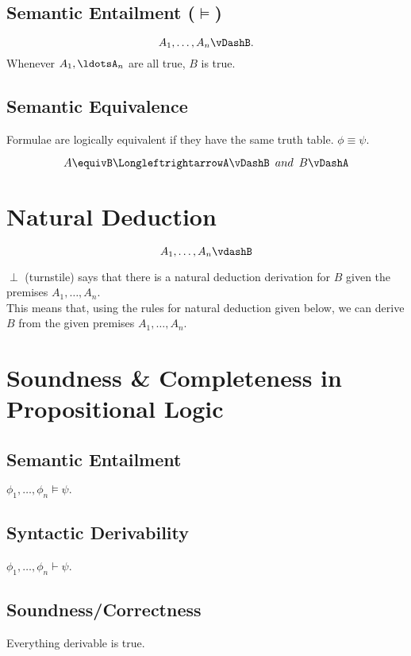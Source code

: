 \documentclass{article}
\begin{document}
\subsection*{Semantic Entailment ($\vDash$)}

\[
A_{1},\ldots,A_{n}\vDashB.
\]
Whenever $A_{1},\ldotsA_{n}$ are all true, $B$ is true.

\subsection*{Semantic Equivalence}

Formulae are logically equivalent if they have the same truth table.
$\phi\equiv\psi$.

\[
A\equivB\LongleftrightarrowA\vDashB\,\,\,and\,\,\,B\vDashA
\]

\section*{Natural Deduction}
$$A_{1},\ldots,A_{n}\vdashB$$

$\perp$ (turnstile) says that there is a natural deduction derivation
for $B$ given the premises $A_{1},\ldots,A_{n}$.
\\This means that, using the rules for natural deduction given below, we can derive $B$ from the given premises $A_1,\ldots, A_n$.

\section*{Soundness \& Completeness in Propositional Logic}

\subsection*{Semantic Entailment}

$\phi_{1},\ldots,\phi_{n}\vDash\psi.$

\subsection{Syntactic Derivability}

$\phi_{1},\ldots,\phi_{n}\vdash\psi$.

\subsection{Soundness/Correctness}

Everything derivable is true.
\end{document}
